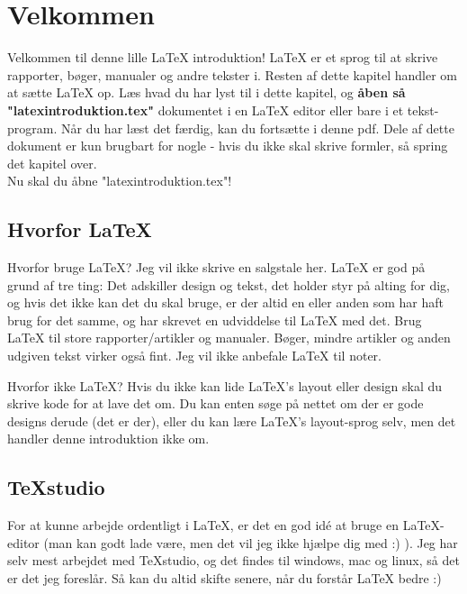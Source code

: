 \chapter{Velkommen}

Velkommen til denne lille LaTeX introduktion!  LaTeX er et sprog til at skrive rapporter, bøger, manualer og andre tekster i. Resten af dette kapitel handler om at sætte LaTeX op. Læs hvad du har lyst til i dette kapitel, og \textbf{åben så "latexintroduktion.tex"} dokumentet i en LaTeX editor eller bare i et tekst-program. Når du har læst det færdig, kan du fortsætte i denne pdf. Dele af dette dokument er kun brugbart for nogle - hvis du ikke skal skrive formler, så spring det kapitel over.\\

\noindent
Nu skal du åbne "latexintroduktion.tex"!

\section{Hvorfor LaTeX}
Hvorfor bruge LaTeX? Jeg vil ikke skrive en salgstale her. LaTeX er god på grund af tre ting: Det adskiller design og tekst, det holder styr på alting for dig, og hvis det ikke kan det du skal bruge, er der altid en eller anden som har haft brug for det samme, og har skrevet en udviddelse til LaTeX med det. Brug LaTeX til store rapporter/artikler og manualer. Bøger, mindre artikler og anden udgiven tekst virker også fint. Jeg vil ikke anbefale LaTeX til noter.

Hvorfor ikke LaTeX? Hvis du ikke kan lide LaTeX's layout eller design skal du skrive kode for at lave det om. Du kan enten søge på nettet om der er gode designs derude (det er der), eller du kan lære LaTeX's layout-sprog selv, men det handler denne introduktion ikke om.

\section{TeXstudio}
For at kunne arbejde ordentligt i LaTeX, er det en god idé at bruge en LaTeX-editor (man kan godt lade være, men det vil jeg ikke hjælpe dig med :) ). Jeg har selv mest arbejdet med TeXstudio, og det findes til windows, mac og linux, så det er det jeg foreslår. Så kan du altid skifte senere, når du forstår LaTeX bedre :)

